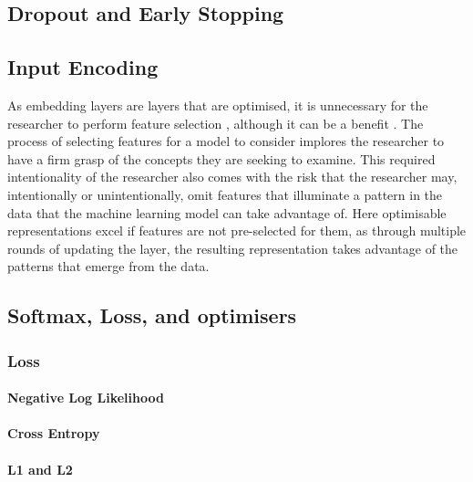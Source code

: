 
\subsection{Dropout and Early Stopping}\label{sec:dropoutearly}

\subsection{Input Encoding}


As embedding layers are layers that are optimised, it is unnecessary for the researcher to perform feature selection \cite{CITE: Papers that say no feature selection is needed}, although it can be a benefit \cite{CITE: Papers that take feature selection into account}. The process of selecting features for a model to consider implores the researcher to have a firm grasp of the concepts they are seeking to examine. This required intentionality of the researcher also comes with the risk that the researcher may, intentionally or unintentionally, omit features that illuminate a pattern in the data that the machine learning model can take advantage of.  Here optimisable representations excel if features are not pre-selected for them, as through multiple rounds of updating the layer, the resulting representation takes advantage of the patterns that emerge from the data.

\subsection{Softmax, Loss, and optimisers}

\subsubsection{Loss}

\paragraph{Negative Log Likelihood}

\paragraph{Cross Entropy}

\paragraph{L1 and L2}

